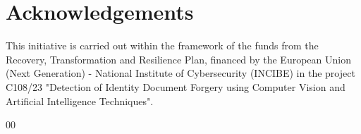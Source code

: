 \documentclass[preprint,12pt, a4paper]{elsarticle}
\begin{document}
\section*{Acknowledgements}
\label{}
This initiative is carried out within the framework of the funds from the Recovery, Transformation and Resilience Plan, financed by the European Union (Next Generation) - National Institute of Cybersecurity (INCIBE) in the project C108/23 "Detection of Identity Document Forgery using Computer Vision and Artificial Intelligence Techniques".





\begin{thebibliography}{00}


\end{thebibliography}
\end{document}
